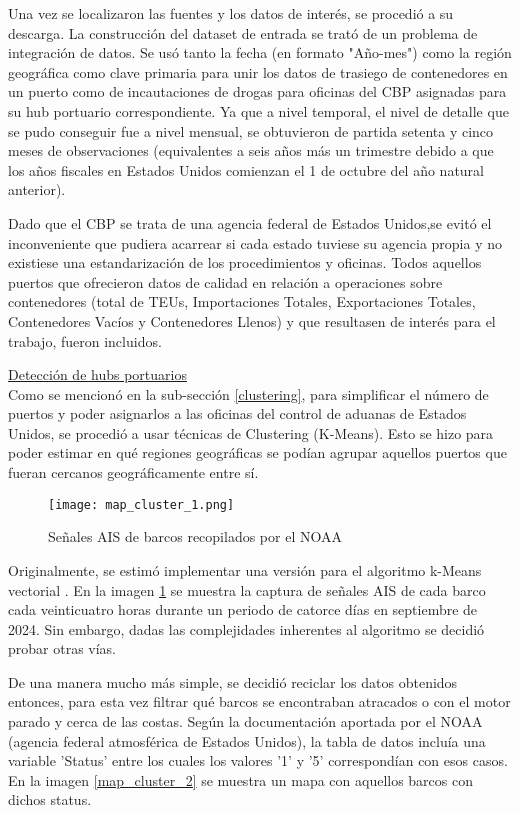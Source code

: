 \documentclass[12pt]{article}
\begin{document}
		
		Una vez se localizaron las fuentes y los datos de interés, se procedió a su descarga. La construcción del dataset de entrada se trató de un problema de integración de datos. Se usó tanto la fecha (en formato "Año-mes") como la región geográfica como clave primaria para unir los datos de trasiego de contenedores en un puerto como de incautaciones de drogas para oficinas del CBP asignadas para su hub portuario correspondiente. Ya que a nivel temporal, el nivel de detalle que se pudo conseguir fue a nivel mensual, se obtuvieron de partida setenta y cinco meses de observaciones (equivalentes a seis años más un trimestre debido a que los años fiscales en Estados Unidos comienzan el 1 de octubre del año natural anterior).
		
		Dado que el CBP se trata de una agencia federal de Estados Unidos,se evitó el inconveniente que pudiera acarrear si cada estado tuviese su agencia propia y no existiese una estandarización de los procedimientos y oficinas. Todos aquellos puertos que ofrecieron datos de calidad en relación a operaciones sobre contenedores (total de TEUs, Importaciones Totales, Exportaciones Totales, Contenedores Vacíos y Contenedores Llenos) y que resultasen de interés para el trabajo, fueron incluidos.
		
		\underline{Detección de hubs portuarios}\\ %
		Como se mencionó en la sub-sección \ref{clustering}, para simplificar el número de puertos y poder asignarlos a las oficinas del control de aduanas de Estados Unidos, se procedió a usar técnicas de Clustering (K-Means). Esto se hizo para poder estimar en qué regiones geográficas se podían agrupar aquellos puertos que fueran cercanos geográficamente entre sí. 
		
		\begin{figure}[H]
			\caption{\label{map_cluster_1} Señales AIS de barcos recopilados por el NOAA}
			\centering
			\texttt{[image: map\_cluster\_1.png]}
		\end{figure}
		
		Originalmente, se estimó implementar una versión para el algoritmo k-Means vectorial \cite{}. En la imagen \ref{map_cluster_1} se muestra la captura de señales AIS de cada barco cada veinticuatro horas durante un periodo de catorce días en septiembre de 2024. Sin embargo, dadas las complejidades inherentes al algoritmo se decidió probar otras vías.
		
		De una manera mucho más simple, se decidió reciclar los datos obtenidos entonces, para esta vez filtrar qué barcos se encontraban atracados o con el motor parado y cerca de las costas. Según la documentación aportada por el NOAA (agencia federal atmosférica de Estados Unidos), la tabla de datos incluía una variable 'Status' entre los cuales los valores '1' y '5' correspondían con esos casos. En la imagen \ref{map_cluster_2} se muestra un mapa con aquellos barcos con dichos status.
		
\end{document}
